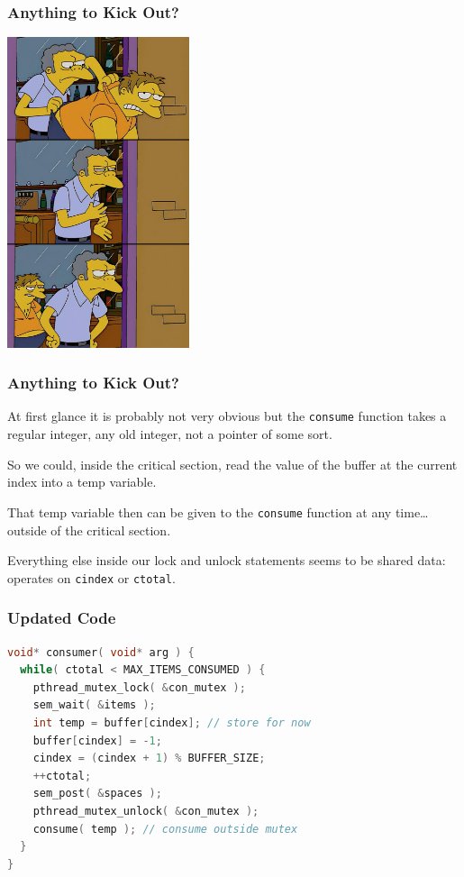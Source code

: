\begin{frame}
\frametitle{Anything to Kick Out?}

\begin{center}
	\includegraphics[width=0.4\textwidth]{images/kickout.png}
\end{center}


\end{frame}



\begin{frame}
\frametitle{Anything to Kick Out?}

At first glance it is probably not very obvious but the \texttt{consume} function takes a regular integer, any old integer, not a pointer of some sort. 

So we could, inside the critical section, read the value of the buffer at the current index into a temp variable. 

That temp variable then can be given to the \texttt{consume} function at any time\ldots outside of the critical section. 

Everything else inside our lock and unlock statements seems to be shared data: operates on \texttt{cindex} or \texttt{ctotal}.


\end{frame}


\begin{frame}[fragile]
\frametitle{Updated Code}

\begin{lstlisting}[language=C]
void* consumer( void* arg ) { 
  while( ctotal < MAX_ITEMS_CONSUMED ) {
    pthread_mutex_lock( &con_mutex );
    sem_wait( &items );
    int temp = buffer[cindex]; // store for now
    buffer[cindex] = -1;
    cindex = (cindex + 1) % BUFFER_SIZE;
    ++ctotal;
    sem_post( &spaces );
    pthread_mutex_unlock( &con_mutex );
    consume( temp ); // consume outside mutex
  }
}
\end{lstlisting}


\end{frame}


